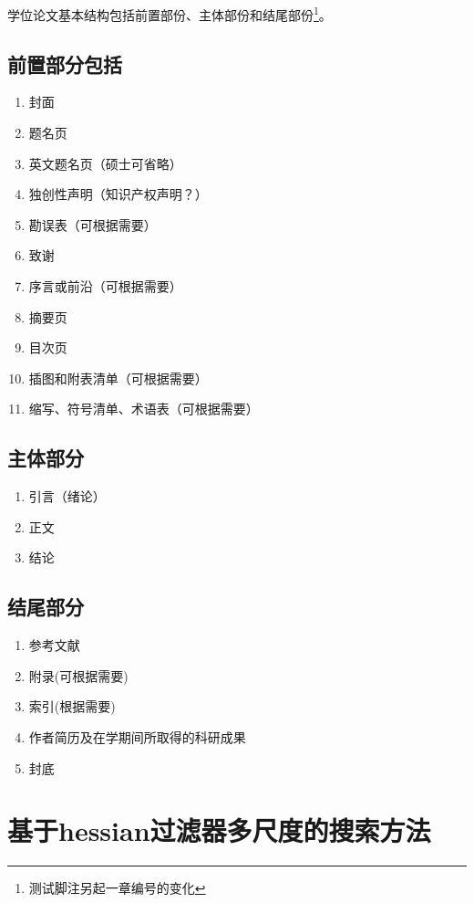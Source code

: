 学位论文基本结构包括前置部份、主体部份和结尾部份\footnote{测试脚注另起一章编号的变化}。
\section{前置部分包括}
\begin{enumerate}
	\item 封面
	\item 题名页
	\item 英文题名页（硕士可省略）
	\item 独创性声明（知识产权声明？）
	\item 勘误表（可根据需要）
	\item 致谢
	\item 序言或前沿（可根据需要）
	\item 摘要页
	\item 目次页
	\item 插图和附表清单（可根据需要）
	\item 缩写、符号清单、术语表（可根据需要）
\end{enumerate}
\section{主体部分}
\begin{enumerate}
	\item 引言（绪论）
	\item 正文
	\item 结论
\end{enumerate}
\section{结尾部分}
\begin{enumerate}
	\item 参考文献
	\item 附录(可根据需要)
	\item 索引(根据需要)
	\item 作者简历及在学期间所取得的科研成果
	\item 封底
\end{enumerate}
\chapter{基于hessian过滤器多尺度的搜索方法}
